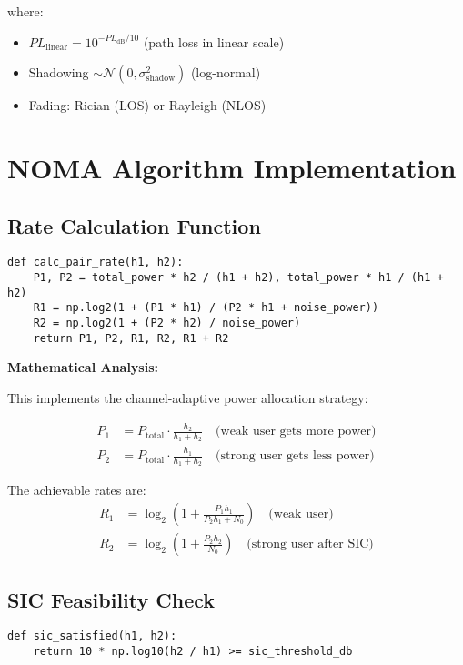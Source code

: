 \documentclass[11pt,a4paper]{article}
\begin{document}
where:
\begin{itemize}
    \item $PL_{\text{linear}} = 10^{-PL_{\text{dB}}/10}$ (path loss in linear scale)
    \item Shadowing $\sim \mathcal{N}(0, \sigma_{\text{shadow}}^2)$ (log-normal)
    \item Fading: Rician (LOS) or Rayleigh (NLOS)
\end{itemize}

\section{NOMA Algorithm Implementation}

\subsection{Rate Calculation Function}

\begin{lstlisting}[caption={NOMA Rate Calculation}]
def calc_pair_rate(h1, h2):
    P1, P2 = total_power * h2 / (h1 + h2), total_power * h1 / (h1 + h2)
    R1 = np.log2(1 + (P1 * h1) / (P2 * h1 + noise_power))
    R2 = np.log2(1 + (P2 * h2) / noise_power)
    return P1, P2, R1, R2, R1 + R2
\end{lstlisting}

\textbf{Mathematical Analysis:}

This implements the channel-adaptive power allocation strategy:

\begin{align}
P_1 &= P_{\text{total}} \cdot \frac{h_2}{h_1 + h_2} \quad \text{(weak user gets more power)} \\
P_2 &= P_{\text{total}} \cdot \frac{h_1}{h_1 + h_2} \quad \text{(strong user gets less power)}
\end{align}

The achievable rates are:
\begin{align}
R_1 &= \log_2\left(1 + \frac{P_1 h_1}{P_2 h_1 + N_0}\right) \quad \text{(weak user)} \\
R_2 &= \log_2\left(1 + \frac{P_2 h_2}{N_0}\right) \quad \text{(strong user after SIC)}
\end{align}

\subsection{SIC Feasibility Check}

\begin{lstlisting}[caption={SIC Condition Verification}]
def sic_satisfied(h1, h2):
    return 10 * np.log10(h2 / h1) >= sic_threshold_db
\end{lstlisting}
\end{document}
